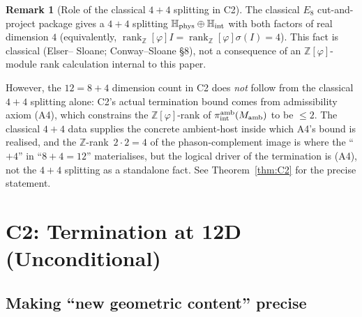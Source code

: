 \documentclass[11pt, a4paper]{amsart}
\theoremstyle{definition}
\newtheorem{remark}[theorem]{Remark}
\newcommand{\Z}{\mathbb{Z}}
\newcommand{\HH}{\mathbb{H}}
\newcommand{\rk}{\operatorname{rank}}
\newcommand{\Ophi}{\mathbb{Z}[\varphi]}
\begin{document}
\begin{remark}[Role of the classical $4+4$ splitting in C2]
\label{rmk:4plus4}
The classical $E_8$ cut-and-project package gives a $4 + 4$
splitting $\HH_{\rm phys} \oplus \HH_{\rm int}$ with both
factors of real dimension $4$ (equivalently, $\rk_\Ophi I =
\rk_\Ophi \sigma(I) = 4$). This fact is classical (Elser--
Sloane; Conway--Sloane \S 8), not a consequence of an
$\Ophi$-module rank calculation internal to this paper.

However, the $12 = 8 + 4$ dimension count in C2 does \emph{not}
follow from the classical $4 + 4$ splitting alone: C2's actual
termination bound comes from admissibility axiom (A4), which
constrains the $\Ophi$-rank of $\pi^{\rm amb}_{\rm int}(M_{\rm
amb})$ to be $\leq 2$. The classical $4 + 4$ data supplies the
concrete ambient-host inside which A4's bound is realised, and
the $\Z$-rank~$2 \cdot 2 = 4$ of the phason-complement image is
where the ``$+4$'' in ``$8 + 4 = 12$'' materialises, but the
logical driver of the termination is (A4), not the $4 + 4$
splitting as a standalone fact. See Theorem~\ref{thm:C2} for
the precise statement.
\end{remark}

\section{$\mathbf{C2}$: Termination at 12D (Unconditional)}
\label{sec:C2}

\subsection{Making ``new geometric content'' precise}
\end{document}

